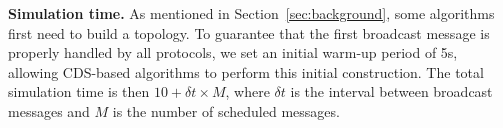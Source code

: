 \smallskip
\noindent
\textbf{Simulation time.}
As mentioned in Section~\ref{sec:background}, some algorithms first need to build a topology.
%
To guarantee that the first broadcast message is properly handled by all protocols, we set an initial warm-up period of 5s, allowing CDS-based algorithms to perform this initial construction.
%
%
The total simulation time is then $10 + {\delta t} \times M$, where ${\delta t}$ is the interval between broadcast messages and $M$ is the number of scheduled messages.






 




